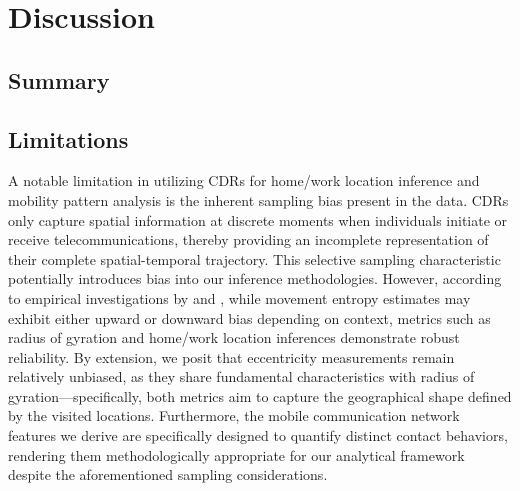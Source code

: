 
\chapter{Discussion}
\section{Summary}

\section{Limitations}
A notable limitation in utilizing CDRs for home/work location inference and mobility pattern analysis is the inherent sampling bias present in the data.
CDRs only capture spatial information at discrete moments when individuals initiate or receive telecommunications, thereby providing an incomplete representation of their complete spatial-temporal trajectory.
This selective sampling characteristic potentially introduces bias into our inference methodologies.
However, according to empirical investigations by \cite{ranjan2012call} and \cite{zhao2016understanding}, while movement entropy estimates may exhibit either upward or downward bias depending on context, metrics such as radius of gyration and home/work location inferences demonstrate robust reliability.
By extension, we posit that eccentricity measurements remain relatively unbiased, as they share fundamental characteristics with radius of gyration—specifically, both metrics aim to capture the geographical shape defined by the visited locations.
Furthermore, the mobile communication network features we derive are specifically designed to quantify distinct contact behaviors, rendering them methodologically appropriate for our analytical framework despite the aforementioned sampling considerations.

